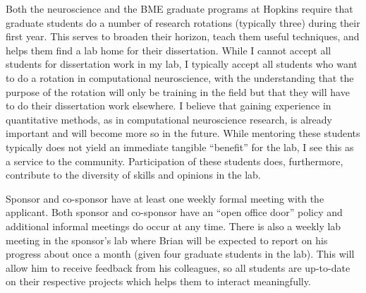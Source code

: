 \documentclass[11pt,notitlepage]{article}
\begin{document}
Both the neuroscience and the BME graduate programs at Hopkins require
that graduate students do a number of research rotations (typically
three) during their first year. This serves to broaden their horizon,
teach them useful techniques, and helps them find a lab home for their
dissertation. While I cannot accept all students for dissertation
work in my lab, I typically accept all students who want to do a
rotation in computational neuroscience, with the understanding that
the purpose of the rotation will only be training in the field but
that they will have to do their dissertation work elsewhere. I believe
that gaining experience in quantitative methods, as in computational
neuroscience research, is already important and will become more so in
the future. While mentoring these students typically does not yield an
immediate tangible ``benefit'' for the lab, I see this as a service to
the community. Participation of these students does, furthermore,
contribute to the diversity of skills and opinions in the lab. 

Sponsor and co-sponsor have at least one weekly formal meeting with
the applicant. Both sponsor and co-sponsor have an ``open office
door'' policy and additional informal meetings do occur at any time.
There is also a weekly lab meeting in the sponsor's lab where Brian will be
expected to report on his progress about once a month (given four
graduate students in the lab). This will allow him to receive feedback
from his colleagues, so all students are up-to-date on their
respective projects which helps them to interact meaningfully.
\end{document}
